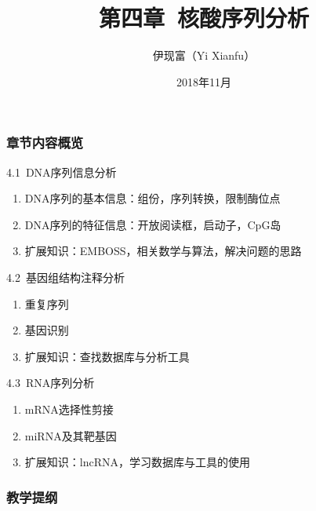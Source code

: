 




\title[核酸序列分析]{第四章\ 核酸序列分析}
\author[Yixf]{伊现富（Yi Xianfu）}
\date{2018年11月}

\begin{frame}
  \titlepage
\end{frame}

\begin{frame}
  \frametitle{章节内容概览}
  \begin{block}{4.1\ DNA序列信息分析}
    \begin{enumerate}
      \item DNA序列的基本信息：组份，序列转换，限制酶位点
      \item DNA序列的特征信息：开放阅读框，启动子，CpG岛
      \item 扩展知识：EMBOSS，相关数学与算法，解决问题的思路
    \end{enumerate}
  \end{block}
  \vspace{-0.2cm}
  \begin{block}{4.2\ 基因组结构注释分析}
    \begin{enumerate}
      \item 重复序列
      \item 基因识别
      \item 扩展知识：查找数据库与分析工具
    \end{enumerate}
  \end{block}
  \vspace{-0.2cm}
  \begin{block}{4.3\ RNA序列分析}
    \begin{enumerate}
      \item mRNA选择性剪接
      \item miRNA及其靶基因
      \item 扩展知识：lncRNA，学习数据库与工具的使用
    \end{enumerate}
  \end{block}
\end{frame}

\begin{frame}[plain]
  \frametitle{教学提纲}
  \setcounter{tocdepth}{2}
  \begin{multicols}{2}
  \tableofcontents
  \end{multicols}
\end{frame}








